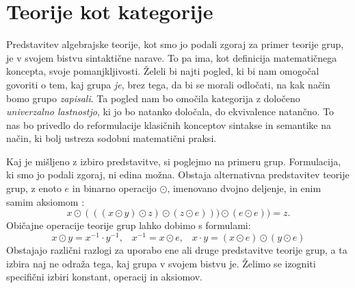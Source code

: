 \documentclass[../kategoricna_logika.tex]{subfiles}
\begin{document}
\section{Teorije kot kategorije}
\label{sec:teorije-kot-kategorije}
Predstavitev algebrajske teorije, kot smo jo podali zgoraj za primer
teorije grup, je v svojem bistvu sintaktične narave. To pa ima,
kot definicija matematičnega koncepta, svoje pomanjkljivosti.
Želeli bi najti pogled, ki bi nam omogočal govoriti o tem,
kaj grupa \emph{je}, brez tega, da bi se morali odločati,
na kak način bomo grupo \emph{zapisali}.
Ta pogled nam bo omočila kategorija z določeno \emph{univerzalno lastnostjo},
ki jo bo natanko določala, do ekvivalence natančno.
To nas bo privedlo do reformulacije klasičnih konceptov
sintakse in semantike na način, ki bolj ustreza sodobni matematični praksi.

Kaj je mišljeno z izbiro predstavitve, si poglejmo na primeru grup.
Formulacija, ki smo jo podali zgoraj, ni edina možna.
Obstaja alternativna predstavitev teorije grup,
z enoto $e$ in binarno operacijo $\odot$,
imenovano dvojno deljenje, in enim samim aksiomom \cite{mccune1993single}:
$$x \odot (((x \odot y ) \odot z ) \odot ( z \odot e))) \odot (e \odot e) ) = z.$$
Običajne operacije teorije grup lahko dobimo s formulami:
$$x \odot y = x^{-1} \cdot y^{-1} \text{,} \quad x^{-1} = x \odot e \text{,} \quad x \cdot y = (x \odot e) \odot (y \odot e)$$
%
Obstajajo različni razlogi za uporabo ene ali druge predstavitve
teorije grup, a ta izbira naj ne odraža tega, kaj grupa v svojem bistvu je.
Želimo se izogniti specifični izbiri konstant, operacij in aksiomov.
\end{document}
